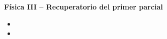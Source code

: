\documentclass[addpoints]{exam}
\begin{document}
\renewcommand{\tablename}{Tabla}


\begin{tcolorbox}[colback=white,arc=0mm,colframe=black]
    \begin{center}
        \Large\textbf{Física III -- Recuperatorio del primer parcial}
    \end{center}
\end{tcolorbox}

\begin{itemize}
    \item {}
    \item {}
\end{itemize}
\end{document}
